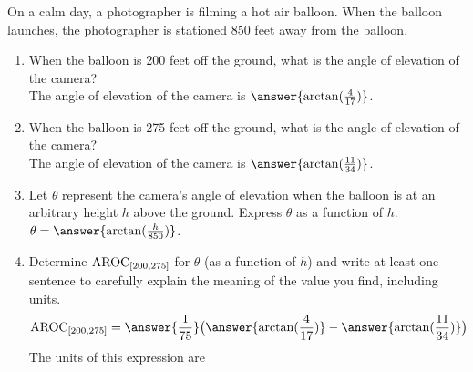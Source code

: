 \documentclass{ximera}
\author{Elizabeth Campolongo}
\begin{document}
\begin{exercise}
On a calm day, a photographer is filming a hot air balloon.  When the balloon launches, the photographer is stationed 850 feet away from the balloon.
%
\begin{enumerate}
\item When the balloon is 200 feet off the ground, what is the angle of elevation of the camera?\\
The angle of elevation of the camera is $\answer{\arctan(\frac{4}{17})}$.
%
\item When the balloon is 275 feet off the ground, what is the angle of elevation of the camera?\\
The angle of elevation of the camera is $\answer{\arctan(\frac{11}{34})}$.
%
\item Let $\theta$ represent the camera's angle of elevation when the balloon is at an arbitrary height $h$ above the ground.  Express $\theta$ as a function of $h$. \\
$\theta = \answer{\arctan(\frac{h}{850})}$.
%
\item Determine $\mathrm{AROC}_{[200,275]}$ for $\theta$ (as a function of $h$) and write at least one sentence to carefully explain the meaning of the value you find, including units.\\
%
$$\av_{[200,275]} = \answer{\frac{1}{75}}\big(\answer{\arctan(\frac{4}{17})} - \answer{\arctan(\frac{11}{34})} \big)$$
%
The units of this expression are 
%
\begin{multipleChoice}
\end{multipleChoice}
%
\end{enumerate}
\end{exercise}
\end{document}
